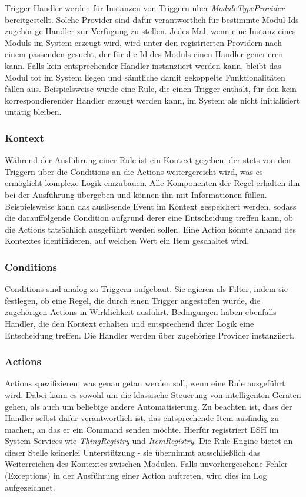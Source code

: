 Trigger-Handler werden für Instanzen von Triggern über \textit{ModuleTypeProvider} bereitgestellt. Solche Provider sind dafür verantwortlich für bestimmte Modul-Ids zugehörige Handler zur Verfügung zu stellen. Jedes Mal, wenn eine Instanz eines Moduls im System erzeugt wird, wird unter den registrierten Providern nach einem passenden gesucht, der für die Id des Moduls einen Handler generieren kann. Falls kein entsprechender Handler instanziiert werden kann, bleibt das Modul tot im System liegen und sämtliche damit gekoppelte Funktionalitäten fallen aus. Beispielsweise würde eine Rule, die einen Trigger enthält, für den kein korrespondierender Handler erzeugt werden kann, im System als \glqq nicht initialisiert\grqq{} untätig bleiben.

\subsubsection{Kontext}
\label{subsubsec:kontext}
Während der Ausführung einer Rule ist ein Kontext gegeben, der stets von den Triggern über die Conditions an die Actions weitergereicht wird, was es ermöglicht komplexe Logik einzubauen. Alle Komponenten der Regel erhalten ihn bei der Ausführung übergeben und können ihn mit Informationen füllen. Beispielsweise kann das auslösende Event im Kontext gespeichert werden, sodass die darauffolgende Condition aufgrund derer eine Entscheidung treffen kann, ob die Actions tatsächlich ausgeführt werden sollen. Eine Action könnte anhand des Kontextes identifizieren, auf welchen Wert ein Item geschaltet wird.

\subsubsection{Conditions}
Conditions sind analog zu Triggern aufgebaut. Sie agieren als Filter, indem sie festlegen, ob eine Regel, die durch einen Trigger angestoßen wurde, die zugehörigen Actions in Wirklichkeit ausführt. Bedingungen haben ebenfalls Handler, die den Kontext erhalten und entsprechend ihrer Logik eine Entscheidung treffen. Die Handler werden über zugehörige Provider instanziiert.

\subsubsection{Actions}
Actions spezifizieren, was genau getan werden soll, wenn eine Rule ausgeführt wird. Dabei kann es sowohl um die klassische Steuerung von intelligenten Geräten gehen, als auch um beliebige andere Automatisierung. Zu beachten ist, dass der Handler selbst dafür verantwortlich ist, das entsprechende Item ausfindig zu machen, an das er ein Command senden möchte. Hierfür registriert ESH im System Services wie \textit{ThingRegistry} und \textit{ItemRegistry}. Die Rule Engine bietet an dieser Stelle keinerlei Unterstützung - sie übernimmt ausschließlich das Weiterreichen des Kontextes zwischen Modulen. Falls unvorhergesehene Fehler (Exceptions) in der Ausführung einer Action auftreten, wird dies im Log aufgezeichnet.


